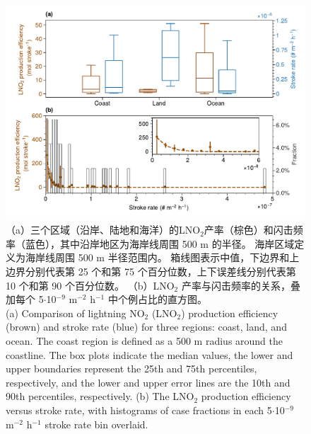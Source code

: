 \begin{figure}[!htbp]
\centering
\includegraphics[width=15cm]{./figures/arctic_pe_rate.pdf}
\caption{
（a）三个区域（沿岸、陆地和海洋）的LNO$_2$产率（棕色）和闪击频率（蓝色），其中沿岸地区为海岸线周围 500 m 的半径。
海岸区域定义为海岸线周围 500 m 半径范围内。
箱线图表示中值，下边界和上边界分别代表第 25 个和第 75 个百分位数，上下误差线分别代表第 10 个和第 90 个百分位数。
（b）LNO$_2$ 产率与闪击频率的关系，叠加每个 5$\cdot$10$^{-9}$ m$^{-2}$ h$^{-1}$ 中个例占比的直方图。 \\
(a) Comparison of lightning NO$_2$ (LNO$_2$) production efficiency (brown) and stroke rate (blue) for three regions: coast, land, and ocean.
The coast region is defined as a 500 m radius around the coastline.
The box plots indicate the median values, the lower and upper boundaries represent the 25th and 75th percentiles, respectively, and the lower and upper error lines are the 10th and 90th percentiles, respectively.
(b) The LNO$_2$ production efficiency versus stroke rate, with histograms of case fractions in each 5$\cdot$10$^{-9}$ m$^{-2}$ h$^{-1}$ stroke rate bin overlaid.
}
\label{fig:arctic_pe_rate}
\end{figure}


